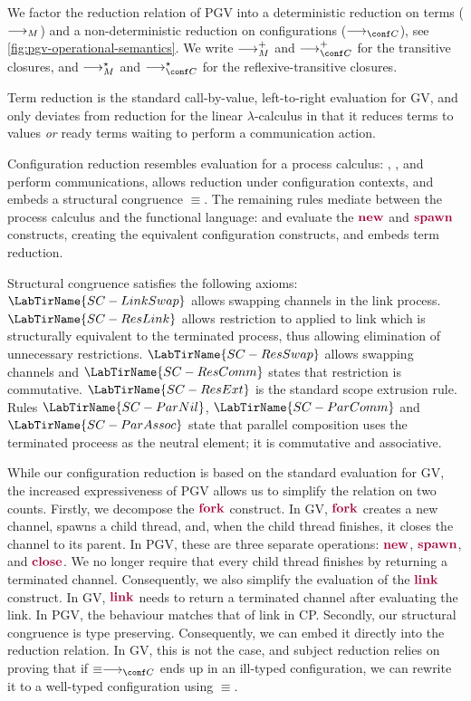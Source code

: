 \documentclass[main.tex]{subfiles}
\begin{document}


We factor the reduction relation of PGV into a deterministic reduction on terms ($\longrightarrow_{M}$) and a non-deterministic reduction on configurations ($\cred$), see \cref{fig:pgv-operational-semantics}. We write $\longrightarrow_{M}^+$ and $\cred^+$ for the transitive closures, and $\longrightarrow_{M}^\star$ and $\cred^\star$ for the reflexive-transitive closures.

Term reduction is the standard call-by-value, left-to-right evaluation for GV, and only deviates from reduction for the linear $\lambda$-calculus in that it reduces terms to values \emph{or} ready terms waiting to perform a communication action.

Configuration reduction resembles evaluation for a process calculus: , , and  perform communications,  allows reduction under configuration contexts, and  embeds a structural congruence $\equiv$. The remaining rules mediate between the process calculus and the functional language:  and  evaluate the $\tm{\new}$ and $\tm{\spawn}$ constructs, creating the equivalent configuration constructs, and  embeds term reduction.

Structural congruence satisfies the following axioms: $\LabTirName{SC-LinkSwap}$ allows swapping channels in the link process. $\LabTirName{SC-ResLink}$ allows restriction to applied to link which is structurally equivalent to the terminated process, thus allowing elimination of unnecessary restrictions. $\LabTirName{SC-ResSwap}$ allows swapping channels and $\LabTirName{SC-ResComm}$ states that restriction is commutative. $\LabTirName{SC-ResExt}$ is the standard scope extrusion rule. Rules $\LabTirName{SC-ParNil}$, $\LabTirName{SC-ParComm}$ and $\LabTirName{SC-ParAssoc}$ state that parallel composition uses the terminated proceess as the neutral element; it is commutative and associative.

While our configuration reduction is based on the standard evaluation for GV, the increased expressiveness of PGV allows us to simplify the relation on two counts.
Firstly, we decompose the $\tm{\fork}$ construct. In GV, $\tm{\fork}$ creates a new channel, spawns a child thread, and, when the child thread finishes, it closes the channel to its parent. In PGV, these are three separate operations: $\tm{\new}$, $\tm{\spawn}$, and $\tm{\close}$. We no longer require that every child thread finishes by returning a terminated channel. Consequently, we also simplify the evaluation of the $\tm{\link}$ construct. In GV, $\tm{\link}$ needs to return a terminated channel after evaluating the link. In PGV, the behaviour matches that of link in CP.
Secondly, our structural congruence is type preserving. Consequently, we can embed it directly into the reduction relation. In GV, this is not the case, and subject reduction relies on proving that if $\equiv\cred$ ends up in an ill-typed configuration, we can rewrite it to a well-typed configuration using $\equiv$.
\end{document}
